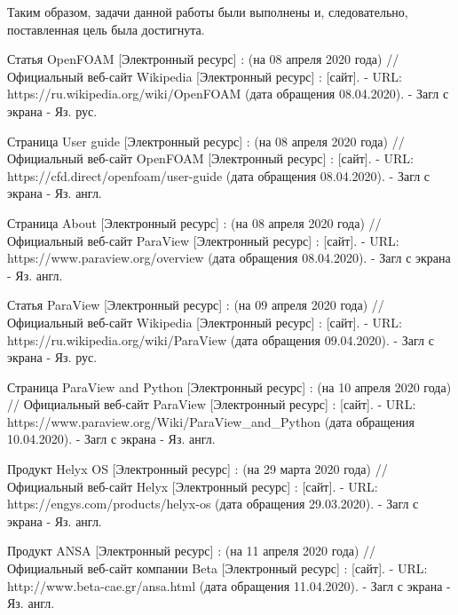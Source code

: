 \documentclass[14pt]{extreport}
\begin{document}
Таким образом, задачи данной работы были выполнены и, следовательно, поставленная цель была достигнута. 


% 

\begin{thebibliography}{9}

   Статья OpenFOAM [Электронный ресурс] : (на 08 апреля 2020 года) // Официальный веб-сайт Wikipedia [Электронный ресурс] : [сайт]. - URL: https://ru.wikipedia.org/wiki/OpenFOAM (дата обращения 08.04.2020). - Загл с экрана - Яз. рус.
   
   Страница User guide [Электронный ресурс] : (на 08 апреля 2020 года) // Официальный веб-сайт OpenFOAM [Электронный ресурс] : [сайт]. - URL: https://cfd.direct/openfoam/user-guide (дата обращения 08.04.2020). - Загл с экрана - Яз. англ.
   
   Страница About [Электронный ресурс] : (на 08 апреля 2020 года) // Официальный веб-сайт ParaView [Электронный ресурс] : [сайт]. - URL: https://www.paraview.org/overview (дата обращения 08.04.2020). - Загл с экрана - Яз. англ.
   
   Статья ParaView [Электронный ресурс] : (на 09 апреля 2020 года) // Официальный веб-сайт Wikipedia [Электронный ресурс] : [сайт]. - URL: https://ru.wikipedia.org/wiki/ParaView (дата обращения 09.04.2020). - Загл с экрана - Яз. рус.
   


   Страница ParaView and Python [Электронный ресурс] : (на 10 апреля 2020 года) // Официальный веб-сайт ParaView [Электронный ресурс] : [сайт]. - URL: https://www.paraview.org/Wiki/ParaView\_and\_Python (дата обращения 10.04.2020). - Загл с экрана - Яз. англ.
  
   Продукт Helyx OS [Электронный ресурс] : (на 29 марта 2020 года) // Официальный веб-сайт Helyx [Электронный ресурс] : [сайт]. - URL: https://engys.com/products/helyx-os (дата обращения 29.03.2020). - Загл с экрана - Яз. англ.
      
   Продукт ANSA [Электронный ресурс] : (на 11 апреля 2020 года) // Официальный веб-сайт компании Beta [Электронный ресурс] : [сайт]. - URL: http://www.beta-cae.gr/ansa.html (дата обращения 11.04.2020). - Загл с экрана - Яз. англ.
   

\end{thebibliography}
\end{document}
